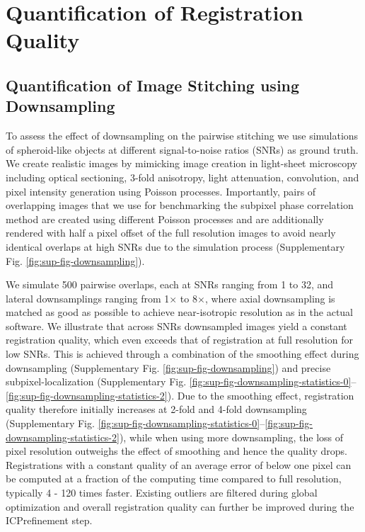 \section{Quantification of Registration Quality}
\label{sec:quantreg}

\subsection*{Quantification of Image Stitching using Downsampling}

To assess the effect of downsampling on the pairwise stitching we use simulations of spheroid-like objects at different signal-to-noise ratios (SNRs) as ground truth. We create realistic images by mimicking image creation in light-sheet microscopy including optical sectioning, 3-fold anisotropy, light attenuation, convolution, and pixel intensity generation using Poisson processes\cite{mvdecon}. Importantly, pairs of overlapping images that we use for benchmarking the subpixel phase correlation method are created using different Poisson processes and are additionally rendered with half a pixel offset of the full resolution images to avoid nearly identical overlaps at high SNRs due to the simulation process (Supplementary Fig. \ref{fig:sup-fig-downsampling}).

We simulate 500 pairwise overlaps, each at SNRs ranging from 1 to 32, and lateral downsamplings ranging from 1$\times$ to 8$\times$, where axial downsampling is matched as good as possible to achieve near-isotropic resolution as in the actual software. We illustrate that across SNRs downsampled images yield a constant registration quality, which even exceeds that of registration at full resolution for low SNRs. This is achieved through a combination of the smoothing effect during downsampling (Supplementary Fig. \ref{fig:sup-fig-downsampling}) and precise subpixel-localization (Supplementary Fig. \ref{fig:sup-fig-downsampling-statistics-0}--\ref{fig:sup-fig-downsampling-statistics-2}). Due to the smoothing effect, registration quality therefore initially increases at 2-fold and 4-fold downsampling (Supplementary Fig. \ref{fig:sup-fig-downsampling-statistics-0}--\ref{fig:sup-fig-downsampling-statistics-2}), while when using more downsampling, the loss of pixel resolution outweighs the effect of smoothing and hence the quality drops. Registrations with a constant quality of an average error of below one pixel can be computed at a fraction of the computing time compared to full resolution, typically 4 - 120 times faster. Existing outliers are filtered during global optimization and overall registration quality can further be improved during the ICP\cite{icp }refinement step.

